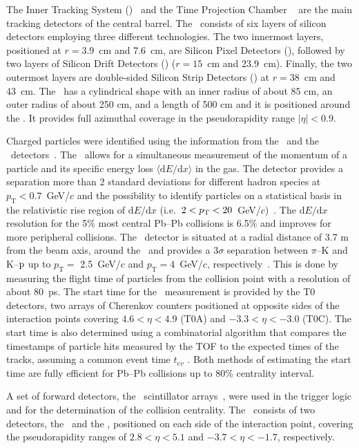 \documentclass[ALICE,manyauthors]{cernphprep}
\begin{document}
The Inner Tracking System (\ITS)~\cite{Aamodt:2008zz} and the Time Projection Chamber \TPC~\cite{Alme:2010ke} are the main tracking detectors of the central barrel. The \ITS~consists of six layers of silicon detectors employing three different technologies. The two innermost layers, positioned at $r = 3.9$~cm and 7.6~cm,  are Silicon Pixel Detectors (\SPD), followed by two layers of Silicon Drift Detectors (\SDD) ($r = 15$~cm and 23.9~cm). Finally, the two outermost layers are double-sided Silicon Strip Detectors (\SSD) at $r = 38$~cm and 43~cm. The \TPC~has a cylindrical shape with an inner radius of about 85 cm, an outer radius of about 250 cm, and a length of 500 cm and it is positioned around the \ITS. It provides full azimuthal coverage in the pseudorapidity range $|\eta| < 0.9$. 

Charged particles were identified using the information from the \TPC~and the \TOF~detectors~\cite{Aamodt:2008zz}. The \TPC~allows for a simultaneous measurement of the momentum of a particle and its specific energy loss $\langle \mathrm{d}E/\mathrm{d}x \rangle$ in the gas. The detector provides a separation more than 2 standard deviations for different hadron species at $p_{\mathrm{T}} < 0.7$~GeV/$c$ and the possibility to identify particles on a statistical basis in the relativistic rise region of $\mathrm{d}E/\mathrm{d}x$ (i.e.~$2 < p_{\rm{T}} < 20$~GeV/$c$)~\cite{Abelev:2014ffa}. The $\mathrm{d}E/\mathrm{d}x$ resolution for the 5$\%$ most central Pb--Pb collisions is 6.5$\%$ and improves for more peripheral collisions. The \TOF~detector is situated at a radial distance of 3.7 m from the beam axis, around the \TPC~and provides a $3\sigma$ separation between $\pi$--K and K--$\rm{p}$ up to $p_{\mathrm{T}} = $ 2.5~GeV/$c$ and $p_{\mathrm{T}} = 4$~GeV/$c$, respectively~\cite{Abelev:2014ffa}. This is done by measuring the flight time of particles from the collision point with a resolution of about $80$~ps. The start time for the \TOF~measurement is provided by the T0 detectors, two arrays of Cherenkov counters positioned at opposite sides of the interaction points covering $4.6 < \eta < 4.9$ (T0A) and $-3.3 < \eta < -3.0$ (T0C). The start time is also determined using a combinatorial algorithm that compares the timestamps of particle hits measured by the TOF to the expected times of the tracks, assuming a common event time $t_{ev}$ \cite{Abelev:2014ffa}. Both methods of estimating the start time are fully efficient for Pb--Pb collisions up to 80\% centrality interval.

A set of forward detectors, the \VZERO~scintillator arrays~\cite{Abbas:2013taa}, were used in the trigger logic and for the determination of the collision centrality. The \VZERO~consists of two detectors, the \VZEROA~and the \VZEROC, positioned on each side of the interaction point, covering the pseudorapidity ranges of $2.8 < \eta < 5.1$ and $-3.7 < \eta < -1.7$, respectively. 
\end{document}
